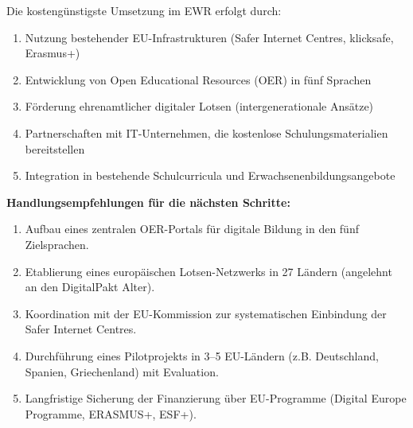 \documentclass[11pt,a4paper]{article}
\begin{document}
	Die kostengünstigste Umsetzung im EWR erfolgt durch:
	\begin{enumerate}
		\item Nutzung bestehender EU-Infrastrukturen (Safer Internet Centres, klicksafe, Erasmus+)
		\item Entwicklung von Open Educational Resources (OER) in fünf Sprachen
		\item Förderung ehrenamtlicher digitaler Lotsen (intergenerationale Ansätze)
		\item Partnerschaften mit IT-Unternehmen, die kostenlose Schulungsmaterialien bereitstellen
		\item Integration in bestehende Schulcurricula und Erwachsenenbildungsangebote
	\end{enumerate}
	
	\textbf{Handlungsempfehlungen für die nächsten Schritte:}
	\begin{enumerate}
		\item Aufbau eines zentralen OER-Portals für digitale Bildung in den fünf Zielsprachen.
		\item Etablierung eines europäischen Lotsen-Netzwerks in 27 Ländern (angelehnt an den DigitalPakt Alter).
		\item Koordination mit der EU-Kommission zur systematischen Einbindung der Safer Internet Centres.
		\item Durchführung eines Pilotprojekts in 3--5 EU-Ländern (z.B. Deutschland, Spanien, Griechenland) mit Evaluation.
		\item Langfristige Sicherung der Finanzierung über EU-Programme (Digital Europe Programme, ERASMUS+, ESF+).
	\end{enumerate}
	
\end{document}
